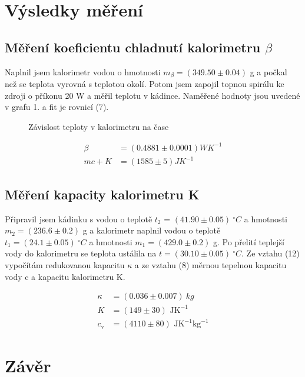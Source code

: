 \documentclass[a4paper,11pt]{article}
\begin{document}
\section{Výsledky měření}

\subsection{Měření koeficientu chladnutí kalorimetru $\beta$}

Naplnil jsem kalorimetr vodou o hmotnosti $m_{\beta} = (349.50 \pm 0.04)$ g a počkal než se teplota vyrovná s teplotou okolí. Potom jsem zapojil topnou spirálu ke zdroji o příkonu 20 W a měřil teplotu v kádince. Naměřené hodnoty jsou uvedené v grafu 1. a fit je rovnicí (7).

\begin{figure}[htpb]
  \centering
  
  \caption{Závislost teploty v kalorimetru na čase}
  \vspace{-30pt}
\end{figure}


\begin{align*}
  \beta &= (0.4881 \pm 0.0001) WK^{-1} \\
  mc + K &= (1585 \pm 5) JK^{-1}
\end{align*}

\vspace{5pt}

\subsection{Měření kapacity kalorimetru K}

Připravil jsem kádinku s vodou o teplotě $t_2$ = $ (41.90 \pm 0.05)\ ^{\circ}C$ a hmotnosti $m_2 = (236.6 \pm 0.2)$ g a kalorimetr naplnil vodou o teplotě $t_1 = (24.1 \pm 0.05)\ ^{\circ}C$ a hmotnosti $m_1 = (429.0 \pm 0.2)$ g. Po přelití teplejší vody do kalorimetru se teplota ustálila na $t=(30.10 \pm 0.05)\ ^{\circ}C$. Ze vztahu (12) vypočítám redukovanou kapacitu $\kappa$ a ze vztahu (8) měrnou tepelnou kapacitu vody c a kapacitu kalorimetru K.


\begin{align*}
  \kappa &= (0.036 \pm 0.007)\ kg \\
  K &= (149 \pm 30) \text{ JK}^{-1} \\
  c_{\text{v}} &=  (4110 \pm 80) \text{ JK}^{-1}\text{kg}^{-1}
\end{align*}

\section{Závěr}
\end{document}
